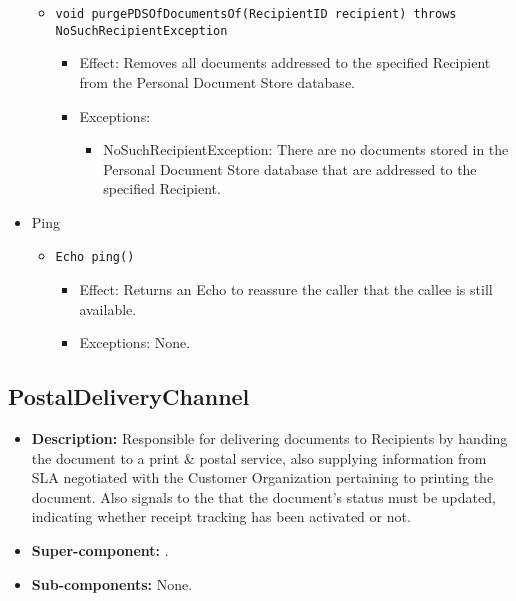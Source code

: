 \begin{itemize}
\begin{itemize}
		\item \texttt{void purgePDSOfDocumentsOf(RecipientID recipient) throws NoSuchRecipientException}
		\begin{itemize}
			\item Effect: Removes all documents addressed to the specified Recipient from the Personal Document Store database.
			\item Exceptions:
			\begin{itemize}
				\item NoSuchRecipientException: There are no documents stored in the Personal Document Store database that are addressed to the specified Recipient.
			\end{itemize}
		\end{itemize}
	\end{itemize}

	\item Ping
	\begin{itemize}
		\item \texttt{Echo ping()}
		\begin{itemize}
			\item Effect: Returns an Echo to reassure the caller that the callee is still available.
			\item Exceptions: None.
		\end{itemize}
	\end{itemize}
\end{itemize}

\subsection{PostalDeliveryChannel}
\begin{itemize}
    \item \textbf{Description:} Responsible for delivering documents to Recipients by handing the document to a print \& postal service, also supplying information from SLA negotiated with the Customer Organization pertaining to printing the document. Also signals to the  that the document's status must be updated, indicating whether receipt tracking has been activated or not.
    \item \textbf{Super-component:} .
    \item \textbf{Sub-components:} None.
\end{itemize}

